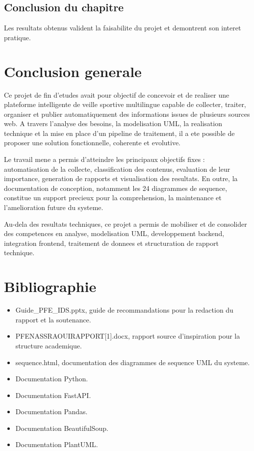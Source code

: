 \documentclass[12pt,a4paper,oneside]{report}
\begin{document}
\section{Conclusion du chapitre}
Les resultats obtenus valident la faisabilite du projet et demontrent son interet pratique.

\chapter*{Conclusion generale}
Ce projet de fin d'etudes avait pour objectif de concevoir et de realiser une plateforme intelligente de veille sportive multilingue capable de collecter, traiter, organiser et publier automatiquement des informations issues de plusieurs sources web. A travers l'analyse des besoins, la modelisation UML, la realisation technique et la mise en place d'un pipeline de traitement, il a ete possible de proposer une solution fonctionnelle, coherente et evolutive.

Le travail mene a permis d'atteindre les principaux objectifs fixes : automatisation de la collecte, classification des contenus, evaluation de leur importance, generation de rapports et visualisation des resultats. En outre, la documentation de conception, notamment les 24 diagrammes de sequence, constitue un support precieux pour la comprehension, la maintenance et l'amelioration future du systeme.

Au-dela des resultats techniques, ce projet a permis de mobiliser et de consolider des competences en analyse, modelisation UML, developpement backend, integration frontend, traitement de donnees et structuration de rapport technique.

\chapter*{Bibliographie}
\begin{itemize}
\item Guide\_PFE\_IDS.pptx, guide de recommandations pour la redaction du rapport et la soutenance.
\item PFENASSRAOUIRAPPORT[1].docx, rapport source d'inspiration pour la structure academique.
\item sequence.html, documentation des diagrammes de sequence UML du systeme.
\item Documentation Python.
\item Documentation FastAPI.
\item Documentation Pandas.
\item Documentation BeautifulSoup.
\item Documentation PlantUML.
\end{itemize}
\end{document}
